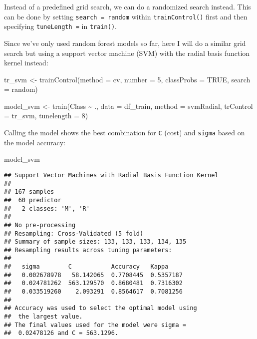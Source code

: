 \documentclass[
]{book}
\newenvironment{Shaded}{\begin{snugshade}}{\end{snugshade}}
\newcommand{\AttributeTok}[1]{\textcolor[rgb]{0.77,0.63,0.00}{#1}}
\newcommand{\ConstantTok}[1]{\textcolor[rgb]{0.00,0.00,0.00}{#1}}
\newcommand{\DecValTok}[1]{\textcolor[rgb]{0.00,0.00,0.81}{#1}}
\newcommand{\FunctionTok}[1]{\textcolor[rgb]{0.00,0.00,0.00}{#1}}
\newcommand{\NormalTok}[1]{#1}
\newcommand{\OtherTok}[1]{\textcolor[rgb]{0.56,0.35,0.01}{#1}}
\newcommand{\SpecialCharTok}[1]{\textcolor[rgb]{0.00,0.00,0.00}{#1}}
\newcommand{\StringTok}[1]{\textcolor[rgb]{0.31,0.60,0.02}{#1}}
\begin{document}
Instead of a predefined grid search, we can do a randomized search instead. This can be done by setting \texttt{search\ =\ \textquotesingle{}random\textquotesingle{}} within \texttt{trainControl()} first and then specifying \texttt{tuneLength\ =} in \texttt{train()}.

Since we've only used random forest models so far, here I will do a similar grid search but using a support vector machine (SVM) with the radial basis function kernel instead:

\begin{Shaded}
\begin{Highlighting}[]
\NormalTok{tr\_svm }\OtherTok{\textless{}{-}} \FunctionTok{trainControl}\NormalTok{(}\AttributeTok{method =} \StringTok{\textquotesingle{}cv\textquotesingle{}}\NormalTok{,}
                   \AttributeTok{number =} \DecValTok{5}\NormalTok{,}
                   \AttributeTok{classProbs =} \ConstantTok{TRUE}\NormalTok{,}
                   \AttributeTok{search =} \StringTok{\textquotesingle{}random\textquotesingle{}}\NormalTok{)}

\NormalTok{model\_svm }\OtherTok{\textless{}{-}} \FunctionTok{train}\NormalTok{(Class }\SpecialCharTok{\textasciitilde{}}\NormalTok{ ., }\AttributeTok{data =}\NormalTok{ df\_train, }
                   \AttributeTok{method =} \StringTok{\textquotesingle{}svmRadial\textquotesingle{}}\NormalTok{,}
                   \AttributeTok{trControl =}\NormalTok{ tr\_svm, }
                   \AttributeTok{tunelength =} \DecValTok{8}\NormalTok{)}
\end{Highlighting}
\end{Shaded}

Calling the model shows the best combination for \texttt{C} (cost) and \texttt{sigma} based on the model accuracy:

\begin{Shaded}
\begin{Highlighting}[]
\NormalTok{model\_svm}
\end{Highlighting}
\end{Shaded}

\begin{verbatim}
## Support Vector Machines with Radial Basis Function Kernel 
## 
## 167 samples
##  60 predictor
##   2 classes: 'M', 'R' 
## 
## No pre-processing
## Resampling: Cross-Validated (5 fold) 
## Summary of sample sizes: 133, 133, 133, 134, 135 
## Resampling results across tuning parameters:
## 
##   sigma        C           Accuracy   Kappa    
##   0.002678978   58.142065  0.7708445  0.5357187
##   0.024781262  563.129570  0.8680481  0.7316302
##   0.033519260    2.093291  0.8564617  0.7081256
## 
## Accuracy was used to select the optimal model using
##  the largest value.
## The final values used for the model were sigma =
##  0.02478126 and C = 563.1296.
\end{verbatim}
\end{document}
